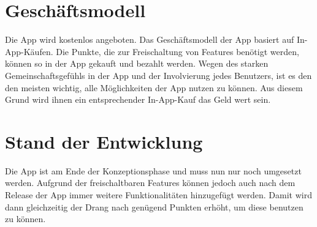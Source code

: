 \section{Geschäftsmodell}

Die App wird kostenlos angeboten. Das Geschäftsmodell der App basiert auf In-App-Käufen. Die Punkte, die zur Freischaltung von Features benötigt werden, können so in der App gekauft und bezahlt werden. Wegen des starken Gemeinschaftsgefühls in der App und der Involvierung jedes Benutzers, ist es den den meisten wichtig, alle Möglichkeiten der App nutzen zu können. Aus diesem Grund wird ihnen ein entsprechender In-App-Kauf das Geld wert sein.

\section{Stand der Entwicklung}

Die App ist am Ende der Konzeptionsphase und muss nun nur noch umgesetzt werden. Aufgrund der freischaltbaren Features können jedoch auch nach dem Release der App immer weitere Funktionalitäten hinzugefügt werden. Damit wird dann gleichzeitig der Drang nach genügend Punkten erhöht, um diese benutzen zu können.
